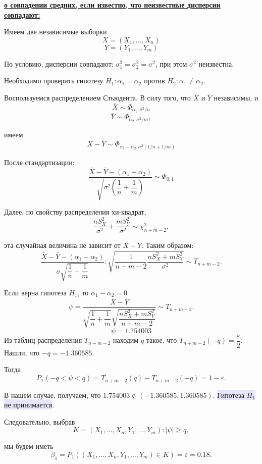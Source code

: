 \documentclass{article}
\begin{document}
\underline{\bf о совпадении средних, если известно, что неизвестные дисперсии совпадают:}

Имеем две независимые выборки
\[X = \left(X_1,\dots, X_n \right)\]
\[Y = \left(Y_1,\dots, Y_m \right)\]

По условию, дисперсии совпадают: $\sigma_1^2=\sigma_2^2=\sigma^2$, при этом $\sigma^2$ неизвестна.

Необходимо проверить гипотезу $H_1: \alpha_1 = \alpha_2$ против $H_2: \alpha_1 \neq \alpha_2$.

Воспользуемся распределением Стьюдента. В силу того, что $\bar X$ и $\bar Y$ независимы, и
\[\bar X \sim \Phi_{\alpha_1, \sigma^2/n}\]
\[\bar Y \sim \Phi_{\alpha_2, \sigma^2/m},\]

имеем 
\[\bar X - \bar Y \sim \Phi_{\alpha_1 - \alpha_2, \sigma^2(1/n+1/m)}\]

После стандартизации:
\[\dfrac{\bar X - \bar Y - (\alpha_1 - \alpha_2)}{\sqrt{\sigma^2\left(\dfrac{1}{n} + \dfrac{1}{m}\right)}} \sim \Phi_{0, 1}\]

Далее, по свойству распределения хи-квадрат, 
\[\dfrac{n S_{X}^2}{\sigma^2} + \dfrac{m S_{Y}^2}{\sigma^2} \sim \chi_{n + m - 2}^2,\]

эта случайная величина не зависит от $\bar X - \bar Y$. Таким образом:
\[\dfrac{\bar X - \bar Y - (\alpha_1 - \alpha_2)}{\sigma \sqrt{\dfrac{1}{n}+ \dfrac{1}{m}}} : \sqrt{\dfrac{1}{n + m - 2} \dfrac{n S_{X}^2 + m S_{Y}^2}{\sigma^2}} \sim T_{n+m-2}.\]

Если верна гипотеза $H_1$, то $\alpha_1 - \alpha_2 = 0$
\[\psi = \dfrac{\bar X - \bar Y}{\sqrt{\dfrac{1}{n} + \dfrac{1}{m}} \sqrt{\dfrac{n S_{X}^2 + m S_{Y}^2}{n + m - 2}}} \sim T_{n + m - 2}.\]
\[\psi = 1.754003\]
Из таблиц распределения $T_{n + m - 2}$ находим $q$ такое, что $T_{n + m - 2}(-q) = \dfrac{\varepsilon}{2}.$ Нашли, что $-q = -1.360585.$

Тогда 
\[P_1(-q < \psi < q) = T_{n + m - 2}(q) - T_{n + m - 2}(-q) = 1 - \varepsilon.\]

В нашем случае, получаем, что $1.754003 \not\in (-1.360585, 1.360585)$. \colorbox{Lavender}{Гипотеза $H_1$ не принимается}. 

Следовательно, выбрав 
\[K = {(X_1, \dots, X_n, Y_1, \dots, Y_m) : |\psi| \geqslant q},\]

мы будем иметь 
\[ \beta_1 = P_1((X_1, \dots, X_n, Y_1, \dots, Y_m) \in K) = \varepsilon = 0.18.\]
\end{document}

